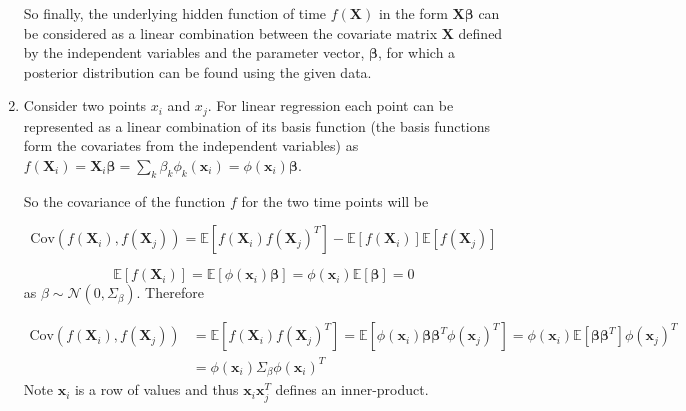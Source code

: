 \documentclass{article}
\newcommand{\EE}{\mathbb{E}}
\newcommand{\Cov}{\mathrm{Cov}}
\begin{document}
\begin{enumerate}
	So finally, the underlying hidden function of time $f(\textbf{X})$ in the form $\textbf{X}\boldsymbol{\beta}$ can be considered as a linear combination between the covariate matrix $\textbf{X}$ defined by the independent variables and the parameter vector, $\boldsymbol{\beta} $, for which a posterior distribution can be found using the given data. 	
	
	
	\item Consider two points $x_i$ and $x_j$. For linear regression each point can be represented as a linear combination of its basis function (the basis functions form the covariates from the independent variables) as $f(\textbf{X}_i) = \textbf{X}_i \boldsymbol{\beta} = \sum_{k} \beta_k \phi_k (\textbf{x}_i) = \phi(\textbf{x}_i) \boldsymbol{\beta} $.
	
	So the covariance of the function $f$ for the two time points will be
	
	\begin{equation}
		\Cov( f(\textbf{X}_i), f(\textbf{X}_j) )
		= \EE [f(\textbf{X}_i)f(\textbf{X}_j)^T] - \EE [f(\textbf{X}_i)]\EE [f(\textbf{X}_j)]
	\end{equation}
	
	\begin{equation}
		\EE [f(\textbf{X}_i)] = \EE[ \phi(\textbf{x}_i) \boldsymbol{\beta}] 
		= \phi(\textbf{x}_i) \EE [ \boldsymbol{\beta}]
		= 0
	\end{equation}
	as $\beta \sim \mathcal{N}(0,\Sigma_\beta)$. Therefore
	
	\begin{equation*}
	\begin{split}
		\Cov( f(\textbf{X}_i), f(\textbf{X}_j) ) &= \EE [f(\textbf{X}_i)f(\textbf{X}_j)^T] = \EE [\phi(\textbf{x}_i) \boldsymbol{\beta}  \boldsymbol{\beta}^T \phi(\textbf{x}_j)^T] = \phi(\textbf{x}_i) \EE[ \boldsymbol{\beta}  \boldsymbol{\beta}^T] \phi(\textbf{x}_j)^T \\
	&= \phi(\textbf{x}_i) \Sigma_\beta \phi(\textbf{x}_i)^T
	\end{split}
	\end{equation*}
	Note $\textbf{x}_i$ is a row of values and thus $\textbf{x}_i \textbf{x}_j^T$ defines an inner-product. 
	

\end{enumerate}
\end{document}
